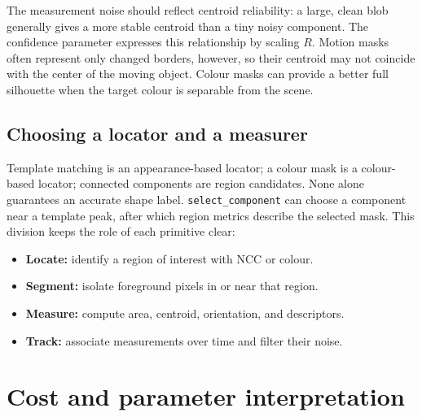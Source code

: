 \documentclass[11pt,a4paper]{article}
\newcommand{\1}{\mathbf{1}}
\begin{document}
The measurement noise should reflect centroid reliability: a large, clean
blob generally gives a more stable centroid than a tiny noisy component. The
confidence parameter expresses this relationship by scaling $R$. Motion masks
often represent only changed borders, however, so their centroid may not
coincide with the center of the moving object. Colour masks can provide a
better full silhouette when the target colour is separable from the scene.

\subsection{Choosing a locator and a measurer}

Template matching is an appearance-based locator; a colour mask is a
colour-based locator; connected components are region candidates. None alone
guarantees an accurate shape label. \texttt{select\_component} can choose a component
near a template peak, after which region metrics describe the selected mask.
This division keeps the role of each primitive clear:
\begin{itemize}
  \item \textbf{Locate:} identify a region of interest with NCC or colour.
  \item \textbf{Segment:} isolate foreground pixels in or near that region.
  \item \textbf{Measure:} compute area, centroid, orientation, and descriptors.
  \item \textbf{Track:} associate measurements over time and filter their noise.
\end{itemize}

\section{Cost and parameter interpretation}
\end{document}
